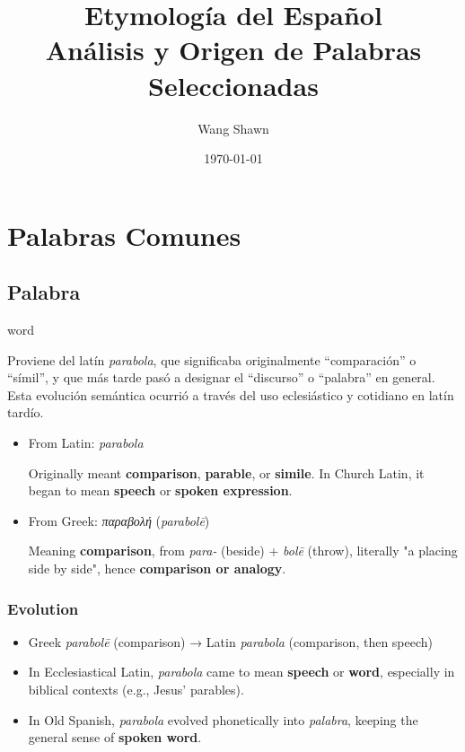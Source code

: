 \documentclass[10pt]{book}
\title{\Huge Etymología del Español\\\large Análisis y Origen de Palabras Seleccionadas}
\author{Wang Shawn}
\date{\today}
\newcommand{\wordentry}[2]{
	\large #1
	\vspace{-0.5em}
	\begin{etymologybox}
		#2
	\end{etymologybox}
}
\let\oldsection\section
\renewcommand{\section}[1]{
	\needspace{8\baselineskip}
	\oldsection{#1}
}
\begin{document}
	\maketitle
	
	\clearpage
	\tableofcontents
	
	\newpage
	
	
	\chapter{Palabras Comunes}
	
	\section{Palabra}
	\wordentry{word}{
		Proviene del latín \textit{parabola}, que significaba originalmente “comparación” o “símil”, y que más tarde pasó a designar el “discurso” o “palabra” en general. Esta evolución semántica ocurrió a través del uso eclesiástico y cotidiano en latín tardío.
		\begin{itemize}
			\item From Latin: \textit{parabola}
			
			Originally meant \textbf{comparison}, \textbf{parable}, or \textbf{simile}. In Church Latin, it began to mean \textbf{speech} or \textbf{spoken expression}.
			
			\item From Greek: \textit{παραβολή} (\textit{parabolē})
			
			Meaning \textbf{comparison}, from \textit{para-} (beside) + \textit{bolē} (throw), literally "a placing side by side", hence \textbf{comparison or analogy}.
		\end{itemize}
	}
	
	\subsection*{Evolution}
	\begin{itemize}
		\item Greek \textit{parabolē} (comparison) → Latin \textit{parabola} (comparison, then speech)
		\item In Ecclesiastical Latin, \textit{parabola} came to mean \textbf{speech} or \textbf{word}, especially in biblical contexts (e.g., Jesus’ parables).
		\item In Old Spanish, \textit{parabola} evolved phonetically into \textit{palabra}, keeping the general sense of \textbf{spoken word}.
	\end{itemize}
	
\end{document}
